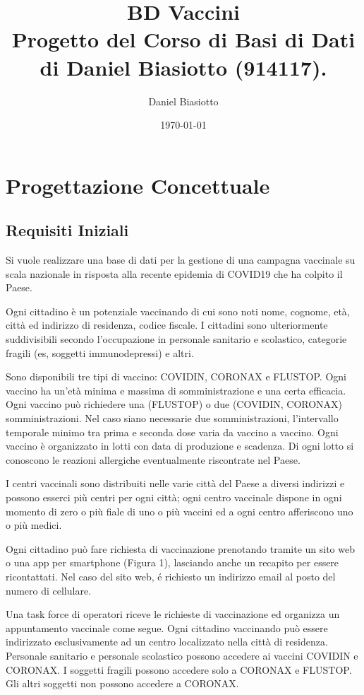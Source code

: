 \documentclass[11pt]{article}
\author{Daniel Biasiotto}
\date{\today}
\title{BD Vaccini\\\medskip
\large Progetto del Corso di Basi di Dati di Daniel Biasiotto (914117).}
\begin{document}
\maketitle
\tableofcontents


\section{Progettazione Concettuale}
\label{sec:org68b6c08}

\subsection{Requisiti Iniziali}
\label{sec:org00759ce}
Si vuole realizzare una base di dati per la gestione di una campagna vaccinale su scala
nazionale in risposta alla recente epidemia di COVID19 che ha colpito il Paese.

Ogni cittadino è un potenziale vaccinando di cui sono noti nome, cognome, età, città ed indirizzo di residenza, codice fiscale.
I cittadini sono ulteriormente suddivisibili secondo l'occupazione in personale sanitario e scolastico, categorie fragili (es, soggetti immunodepressi) e altri.

Sono disponibili tre tipi di vaccino: COVIDIN, CORONAX e FLUSTOP.
Ogni vaccino ha un'età minima e massima di somministrazione e una certa efficacia.
Ogni vaccino può richiedere una (FLUSTOP) o due (COVIDIN, CORONAX) somministrazioni. Nel caso siano necessarie due somministrazioni, l'intervallo temporale minimo tra prima e seconda dose varia da vaccino a vaccino.
Ogni vaccino è organizzato in lotti con data di produzione e scadenza. Di ogni lotto si conoscono le reazioni allergiche eventualmente riscontrate nel Paese.

I centri vaccinali sono distribuiti nelle varie città del Paese a diversi indirizzi e possono esserci più centri per ogni città;
ogni centro vaccinale dispone in ogni momento di zero o più fiale di uno o più vaccini ed a ogni centro afferiscono uno o più medici.

Ogni cittadino può fare richiesta di vaccinazione prenotando tramite un sito web o una app per smartphone (Figura 1), lasciando anche un recapito per essere ricontattati. Nel caso del sito web, é richiesto un indirizzo email al posto del numero di cellulare.

Una task force di operatori riceve le richieste di vaccinazione ed organizza un appuntamento vaccinale come segue.
Ogni cittadino vaccinando può essere indirizzato esclusivamente ad un centro localizzato nella città di residenza.
Personale sanitario e personale scolastico possono accedere ai vaccini COVIDIN e CORONAX.
I soggetti fragili possono accedere solo a CORONAX e FLUSTOP.
Gli altri soggetti non possono accedere a CORONAX.
\end{document}
